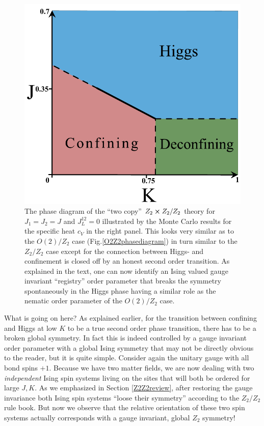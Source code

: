 \begin{figure}[!h]
	\centering	\includegraphics[width=0.425\linewidth]{figures/chapter2/Z2xZ2Z2phasedia.pdf}
	\caption{ The phase diagram of the ``two copy''  $Z_2 \cross Z_2 / Z_2$ theory for $J_1 = J_2  = J$ and $J_L^{12} = 0 $ illustrated by  the Monte Carlo results  for the specific heat $c_V$ in the right panel. This looks very similar as to the $O(2)/Z_2$ case (Fig.\ref{O2Z2phasediagram}) in turn similar to the $Z_2/Z_2$ case  except for the connection between Higgs- and confinement is closed off by an honest second order transition. As explained in the text, one can now identify an Ising valued gauge invariant ``registry'' order parameter that breaks the symmetry spontaneously in the Higgs phase having a similar role as the nematic order parameter of the $O(2)/Z_2$ case.} 
	\label{Z2xZ2Z2phasediagram}
\end{figure}

What is going on here? As explained earlier, for the transition between confining and Higgs at low $K$ to be a true second order phase transition, there has to be a broken global symmetry. In fact this is indeed controlled by a gauge invariant order parameter with a global Ising symmetry that may not be directly obvious to the reader, but it is quite simple. Consider again the unitary gauge with all bond spins $+ 1$. Because we have two matter fields, we are now dealing with two {\em independent} Ising spin systems living on the sites that will both be ordered for large $J,K$. As we emphasized in Section \ref{Z2Z2review}, after restoring the gauge invariance  both Ising spin systems ``loose their symmetry'' according to the $Z_2/Z_2$ rule book. But now we observe that the relative orientation of these two spin systems actually corresponds  with a  gauge invariant, global $Z_2$ symmetry! 


